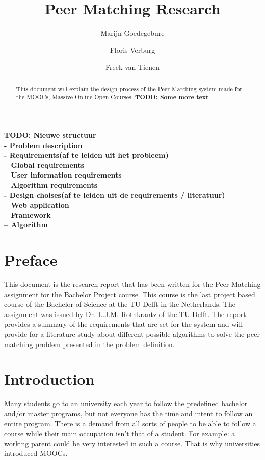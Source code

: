 \documentclass[]{article}
\title{Peer Matching Research}
\author{Marijn Goedegebure \and
	Floris Verburg \and
	Freek van Tienen}
\date{}
\newcommand{\TODO}[1]{{\color{red}\textbf{TODO: #1}}}
\begin{document}
\maketitle

\begin{abstract}
This document will explain the design process of the Peer Matching system made for the MOOCs, Massive Online Open Courses.
\TODO{Some more text}
\end{abstract}

\TODO{
Nieuwe structuur\\
- Problem description\\
- Requirements(af te leiden uit het probleem)\\
-- Global requirements\\
-- User information requirements\\
-- Algorithm requirements\\
- Design choises(af te leiden uit de requirements / literatuur)\\
-- Web application\\
-- Framework\\
-- Algorithm\\}

\newpage

\tableofcontents

\newpage

\section{Preface}
This document is the research report that has been written for the Peer Matching assignment for the Bachelor Project course. This course is the last project based course of the Bachelor of Science at the TU Delft in the Netherlands. The assignment was issued by Dr. L.J.M. Rothkrantz of the TU Delft.
The report provides a summary of the requirements that are set for the system and will provide for a literature study about different possible algorithms to solve the peer matching problem presented in the problem definition.

\section{Introduction}
Many students go to an university each year to follow the predefined bachelor and/or master programs, but not everyone has the time and intent to follow an entire program.
There is a demand from all sorts of people to be able to follow a course while their main occupation isn't that of a student.
For example: a working parent could be very interested in such a course.
That is why universities introduced MOOCs.
\end{document}
